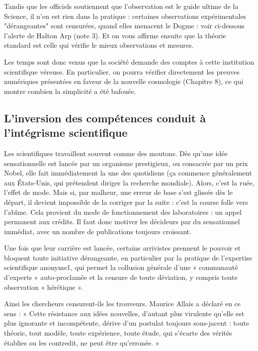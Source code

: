 \documentclass[a4paper,12pt]{article}
\begin{document}
Tandis que les officiels soutiennent que l’observation est le guide ultime de la Science, il n’en est rien dans la pratique : certaines observations expérimentales "dérangeantes" sont censurées, quand elles menacent le Dogme : voir ci-dessous l’alerte de Halton Arp (note 3). Et on vous affirme ensuite que la théorie standard est celle qui vérifie le mieux observations et mesures.


Les temps sont donc venus que la société demande des comptes à cette institution scientifique véreuse. En particulier, on pourra vérifier directement les preuves numériques présentées en faveur de la nouvelle cosmologie (Chapitre 8), ce qui montre combien la simplicité a été bafouée.




\subsection {L'inversion des compétences conduit à l'intégrisme scientifique}

Les scientifiques travaillent souvent comme des moutons. Dès qu'une idée sensationnelle est lancée par un organisme prestigieux, ou consacrée par un prix Nobel, elle fait immédiatement la une des quotidiens (ça commence généralement aux États-Unis, qui prétendent diriger la recherche mondiale). Alors, c'est la ruée, l'effet de mode. 
Mais si, par malheur, une erreur de base s'est glissée dès le départ, il devient impossible de la corriger par la suite : c'est la course folle vers l'abîme. Cela provient du mode de fonctionnement des laboratoires : un appel permanent aux crédits. Il faut donc motiver les décideurs par du sensationnel immédiat, avec un nombre de publications toujours croissant.
 
Une fois que leur carrière est lancée, certains arrivistes prennent le pouvoir et bloquent toute initiative dérangeante, en particulier par la pratique de l'expertise scientifique anonyme1, qui permet la collusion générale d'une « communauté d'experts » auto-proclamée et la censure de toute déviation, y compris toute observation « hérétique ». 

Ainsi les chercheurs censurent-ils les trouveurs. Maurice Allais a déclaré en ce sens : « Cette résistance aux idées nouvelles, d'autant plus virulente qu'elle est plus ignorante et incompétente, dérive d'un postulat toujours sous-jacent : toute théorie, tout modèle, toute expérience, toute étude, qui s'écarte des vérités établies ou les contredit, ne peut être qu'erronée. » 
\end{document}

